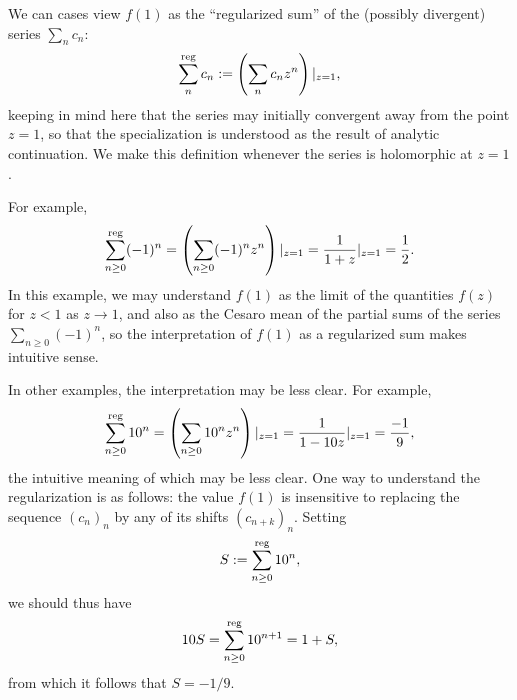 \documentclass[reqno]{amsart}  \numberwithin{theorem}{section} \numberwithin{equation}{section}
\begin{document}
\begin{remark}
  We can cases view $f(1)$ as the ``regularized sum'' of the (possibly divergent) series $\sum_n c_n$:
  \begin{equation*}
    \sum_{n}^{\operatorname{reg}} c_n := \left( \sum_n c_n z^n \right)|_{z=1}, 
  \end{equation*}
  keeping in mind here that the series may initially convergent away from the point $z=1$, so that the specialization is understood as the result of analytic continuation.  We make this definition whenever the series is holomorphic at $z=1$.

  For example,
  \begin{equation*}
    \sum_{n \geq 0}^{\operatorname{reg}} (-1)^n
    =
    \left( \sum_{n \geq 0} (-1)^n z^n \right)|_{z=1}
    = \frac{1}{1 + z} \vert_{z=1} = \frac{1}{2}.
  \end{equation*}
  In this example, we may understand $f(1)$ as the limit of the quantities $f(z)$ for $z < 1$ as $z \rightarrow 1$, and also as the Cesaro mean of the partial sums of the series $\sum_{n \geq 0} (-1)^n$, so the interpretation of $f(1)$ as a regularized sum makes intuitive sense.

  In other examples, the interpretation may be less clear.  For example,
  \begin{equation*}
    \sum_{n \geq 0}^{\operatorname{reg}} 10^n =
    \left( \sum_{n \geq 0} 10^n z^n \right)|_{z=1}
    =
    \frac{1}{1 - 10 z} \vert_{z=1} =
    \frac{-1}{9},
  \end{equation*}
  the intuitive meaning of which may be less clear.  One way to understand the regularization is as follows: the value $f(1)$ is insensitive to replacing the sequence $(c_n)_n$ by any of its shifts $(c_{n+k})_n$.  Setting
  \begin{equation*}
    S := \sum_{n \geq 0}^{\operatorname{reg}} 10^n,
  \end{equation*}
  we should thus have
  \begin{equation*}
    10 S = \sum_{n \geq 0}^{\operatorname{reg}} 10^{n+1}
    = 1 + S,
  \end{equation*}
  from which it follows that $S = -1/9$.
\end{remark}
\end{document}
